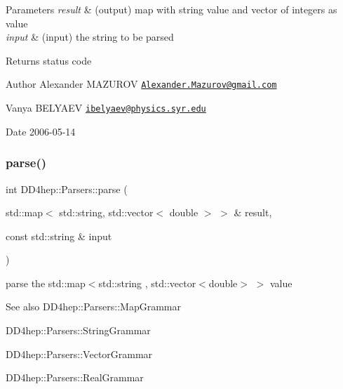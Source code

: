 \begin{DoxyParams}{Parameters}
{\em result} & (output) map with string value and vector of integers as value \\
\hline
{\em input} & (input) the string to be parsed \\
\hline
\end{DoxyParams}
\begin{DoxyReturn}{Returns}
status code
\end{DoxyReturn}
\begin{DoxyAuthor}{Author}
Alexander M\+A\+Z\+U\+R\+OV \href{mailto:Alexander.Mazurov@gmail.com}{\tt Alexander.\+Mazurov@gmail.\+com} 

Vanya B\+E\+L\+Y\+A\+EV \href{mailto:ibelyaev@physics.syr.edu}{\tt ibelyaev@physics.\+syr.\+edu} 
\end{DoxyAuthor}
\begin{DoxyDate}{Date}
2006-\/05-\/14 
\end{DoxyDate}
\hypertarget{namespace_d_d4hep_1_1_parsers_a117aacde08a7caa18db156f5871ad9cf}{}\label{namespace_d_d4hep_1_1_parsers_a117aacde08a7caa18db156f5871ad9cf} 
\subsubsection{\texorpdfstring{parse()}{parse()}\hspace{0.1cm}{\footnotesize\ttfamily [13/21]}}
{\footnotesize\ttfamily int D\+D4hep\+::\+Parsers\+::parse (\begin{DoxyParamCaption}\item[{std\+::map$<$ std\+::string, std\+::vector$<$ double $>$ $>$ \&}]{result,  }\item[{const std\+::string \&}]{input }\end{DoxyParamCaption})}



parse the {\ttfamily std\+::map$<$std\+::string , std\+::vector$<$double$>$ $>$} value 

\begin{DoxySeeAlso}{See also}
D\+D4hep\+::\+Parsers\+::\+Map\+Grammar 

D\+D4hep\+::\+Parsers\+::\+String\+Grammar 

D\+D4hep\+::\+Parsers\+::\+Vector\+Grammar 

D\+D4hep\+::\+Parsers\+::\+Real\+Grammar 
\end{DoxySeeAlso}

